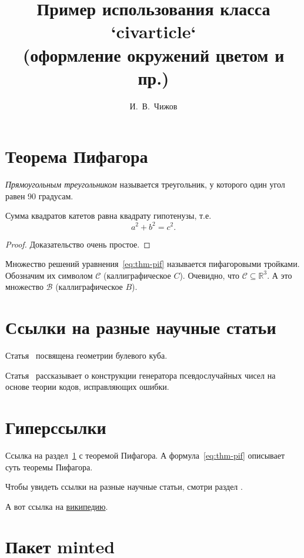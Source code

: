 \documentclass[12pt, minted]{civarticle}
\title{
    Пример использования класса `civarticle`\\
    \small{(оформление окружений цветом и пр.)}
}
\author{И.~В.~Чижов}
\begin{document}
    \section{Теорема Пифагора}
    \label{sec:thm-pif}
    \begin{definition}
        \label{def:triangle}
        \emph{Прямоугольным треугольником} называется треугольник, у которого один угол равен 90 градусам.
    \end{definition}
    \begin{theorem}
        Сумма квадратов катетов равна квадрату гипотенузы, т.е.
        \begin{equation}
            \label{eq:thm-pif}
            a^2+b^2=c^2.
        \end{equation}
    \end{theorem}
    \begin{proof}
        Доказательство очень простое.
    \end{proof}
    Множество решений уравнения~\eqref{eq:thm-pif} называется пифагоровыми тройками.
    Обозначим их символом $\mathcal{C}$ (каллиграфическое $C$).
    Очевидно, что $\mathcal{C}\subseteq \mathbb{R}^{3}$.
    А это множество $\mathcal{B}$ (каллиграфическое $B$).

    \blindmathtrue
    \Blindtext[11][1]


    \section{Ссылки на разные научные статьи}
    \label{sec:ref-to-articles}

    Статья~\cite{ahlswede1977} посвящена геометрии булевого куба.

    Статья~\cite{ahmed2013} рассказывает о конструкции генератора псевдослучайных чисел на основе теории кодов, исправляющих ошибки.


    \section{Гиперссылки}
    \label{sec:hyper}

    Ссылка на раздел~\ref{sec:thm-pif} с теоремой Пифагора.
    А формула~\eqref{eq:thm-pif} описывает суть теоремы Пифагора.

    Чтобы увидеть ссылки на разные научные статьи, смотри раздел \hyperref[sec:ref-to-articles]{}.

    А вот ссылка на \href{https://ru.wikipedia.org}{википедию}.


    \section{Пакет minted}
    \label{sec:minted}
    \if \MINTED\empty
    \else
        \inputminted{python}{code.py}
    \fi
\end{document}
